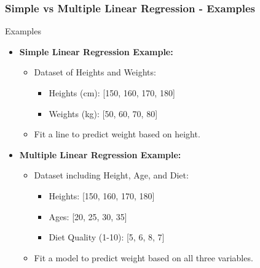 \documentclass[aspectratio=169]{beamer}
\begin{document}
\begin{frame}[fragile]
  \frametitle{Simple vs Multiple Linear Regression - Examples}
  \begin{block}{Examples}
    \begin{itemize}
      \item \textbf{Simple Linear Regression Example:}
      \begin{itemize}
        \item Dataset of Heights and Weights:
        \begin{itemize}
          \item Heights (cm): [150, 160, 170, 180]
          \item Weights (kg): [50, 60, 70, 80]
        \end{itemize}
        \item Fit a line to predict weight based on height.
      \end{itemize}

      \item \textbf{Multiple Linear Regression Example:}
      \begin{itemize}
        \item Dataset including Height, Age, and Diet:
        \begin{itemize}
          \item Heights: [150, 160, 170, 180]
          \item Ages: [20, 25, 30, 35]
          \item Diet Quality (1-10): [5, 6, 8, 7]
        \end{itemize}
        \item Fit a model to predict weight based on all three variables.
      \end{itemize}
    \end{itemize}
  \end{block}
\end{frame}
\end{document}
